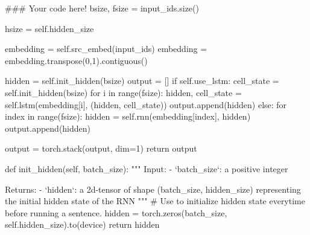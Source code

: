 \begin{python}
      ### Your code here!
      bsize, fsize = input_ids.size()

      hsize = self.hidden_size

      embedding = self.src_embed(input_ids)
      embedding = embedding.transpose(0,1).contiguous()
 
      hidden = self.init_hidden(bsize)
      output = []
      if self.use_lstm:
        cell_state = self.init_hidden(bsize)
        for i in range(fsize):
          hidden, cell_state = self.lstm(embedding[i], (hidden, cell_state))
          output.append(hidden)
      else:
        for index in range(fsize):
          hidden = self.rnn(embedding[index], hidden)
          output.append(hidden)
      
      output = torch.stack(output, dim=1)
      return output

    def init_hidden(self, batch_size):
      """
      Input:
        - `batch_size`: a positive integer

      Returns:
        - `hidden`: a 2d-tensor of shape (batch_size, hidden_size) representing
            the initial hidden state of the RNN
      """
      # Use to initialize hidden state everytime before running a sentence.
      hidden = torch.zeros(batch_size, self.hidden_size).to(device)
      return hidden
\end{python}

